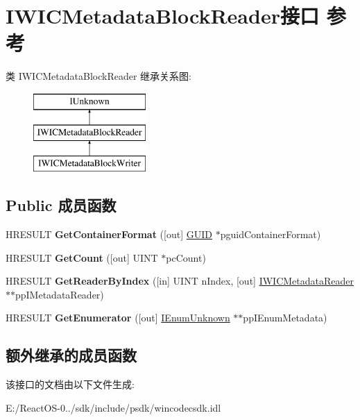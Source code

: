 \hypertarget{interface_i_w_i_c_metadata_block_reader}{}\section{I\+W\+I\+C\+Metadata\+Block\+Reader接口 参考}
\label{interface_i_w_i_c_metadata_block_reader}
类 I\+W\+I\+C\+Metadata\+Block\+Reader 继承关系图\+:\begin{figure}[H]
\begin{center}
\leavevmode
\includegraphics[height=3.000000cm]{interface_i_w_i_c_metadata_block_reader}
\end{center}
\end{figure}
\subsection*{Public 成员函数}
\begin{DoxyCompactItemize}
\item 
\mbox{\label{interface_i_w_i_c_metadata_block_reader_aa4f03a1aa6c65fae83aeb3c0ed977687}} 
H\+R\+E\+S\+U\+LT {\bfseries Get\+Container\+Format} (\mbox{[}out\mbox{]} \hyperlink{interface_g_u_i_d}{G\+U\+ID} $\ast$pguid\+Container\+Format)
\item 
\mbox{\label{interface_i_w_i_c_metadata_block_reader_a085a1aadf519b5700099e1ed7dd45d1f}} 
H\+R\+E\+S\+U\+LT {\bfseries Get\+Count} (\mbox{[}out\mbox{]} U\+I\+NT $\ast$pc\+Count)
\item 
\mbox{\label{interface_i_w_i_c_metadata_block_reader_a8a18a936a5361947eaf5843bbd34b441}} 
H\+R\+E\+S\+U\+LT {\bfseries Get\+Reader\+By\+Index} (\mbox{[}in\mbox{]} U\+I\+NT n\+Index, \mbox{[}out\mbox{]} \hyperlink{interface_i_w_i_c_metadata_reader}{I\+W\+I\+C\+Metadata\+Reader} $\ast$$\ast$pp\+I\+Metadata\+Reader)
\item 
\mbox{\label{interface_i_w_i_c_metadata_block_reader_a06ab9779b83abe7993ef043f41bfba3a}} 
H\+R\+E\+S\+U\+LT {\bfseries Get\+Enumerator} (\mbox{[}out\mbox{]} \hyperlink{interface_i_enum_unknown}{I\+Enum\+Unknown} $\ast$$\ast$pp\+I\+Enum\+Metadata)
\end{DoxyCompactItemize}
\subsection*{额外继承的成员函数}


该接口的文档由以下文件生成\+:\begin{DoxyCompactItemize}
\item 
E\+:/\+React\+O\+S-\/0../sdk/include/psdk/wincodecsdk.\+idl\end{DoxyCompactItemize}
